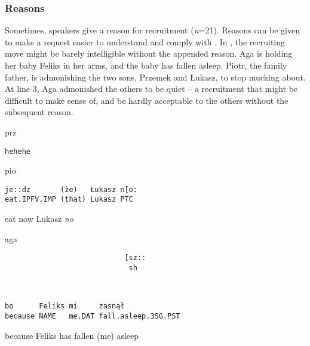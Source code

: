 \documentclass[output=paper]{langsci/langscibook}
\begin{document}
\subsubsection{Reasons}
\largerpage
Sometimes, speakers give a reason for recruitment (\textit{n}=21).  Reasons can be given to make a request easier to understand and comply with \citep{BaranovaDingemanse2016}. In , the recruiting move might be barely intelligible without the appended reason.  Aga is holding her baby Feliks in her arms, and the baby has fallen asleep. Piotr, the family father, is admonishing the two sons, Przemek and Łukasz, to stop mucking about.  At line 3, Aga admonished the others to be quiet -- a recruitment that might be difficult to make sense of, and be hardly acceptable to the others without the subsequent reason.

\vspace{2mm}
%
\begin{transbox}{1}{prz}
\begin{verbatim}
hehehe
\end{verbatim}
\end{transbox}
%
\begin{transbox}{2}{pio}
\begin{verbatim}
je::dz       (że)   Łukasz n[o:
eat.IPFV.IMP (that) Lukasz PTC
\end{verbatim}
eat now Lukasz \textit{no}
\end{transbox}
%
\begin{mdframednoverticalspace}[style=firstfoc]
\begin{transbox}{3}{aga}
\begin{verbatim}
                            [sz::
                             sh
\end{verbatim}
\end{transbox}
\end{mdframednoverticalspace}
%
\begin{mdframednoverticalspace}[style=firstfoc]
\begin{transbox}{4}{~}
\begin{verbatim}
bo      Feliks mi     zasnął
because NAME   me.DAT fall.asleep.3SG.PST
\end{verbatim}
because Feliks has fallen (me) asleep
\end{transbox}
\end{mdframednoverticalspace}
%
\begin{mdframednoverticalspace}[style=secondfoc]
\end{mdframednoverticalspace}
\end{document}
